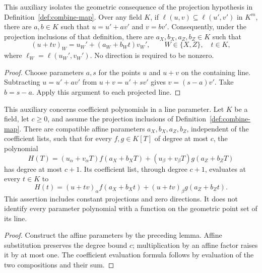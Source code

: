 \begin{lemma}
	\label{lem:combine-map-affine-parameters}
	\leanok
	This auxiliary isolates the geometric consequence of the projection
	hypothesis in Definition~\ref{def:combine-map}. Over any field $K$, if
	$\ell(u,v)\subseteq\ell(u',v')$ in $K^m$, there are $a,b\in K$ such that
	$u=u'+av'$ and $v=bv'$. Consequently, under the projection inclusions
	of that definition, there are $a_X,b_X,a_Z,b_Z\in K$ such that
	\[
		(u+tv)_W=u_W'+(a_W+b_Wt)v_W',
		\qquad W\in\{X,Z\},\quad t\in K,
	\]
	where $\ell_W=\ell(u_W',v_W')$. No direction is required to be nonzero.
\end{lemma}
\begin{proof}
	\leanok
	Choose parameters $a,s$ for the points $u$ and $u+v$ on the containing
	line. Subtracting $u=u'+av'$ from $u+v=u'+sv'$ gives
	$v=(s-a)v'$. Take $b=s-a$. Apply this argument to each projected line.
\end{proof}

\begin{lemma}
	\label{lem:combine-map-parameter-polynomial}
	\leanok
	This auxiliary concerns coefficient polynomials in a line parameter.
	Let $K$ be a field, let $c\geq0$, and assume the projection inclusions
	of Definition~\ref{def:combine-map}. There are compatible affine
	parameters $a_X,b_X,a_Z,b_Z$, independent of the coefficient lists,
	such that for every $f,g\in K[T]$ of degree at most $c$, the polynomial
	\[
		H(T)=(u_\alpha+v_\alpha T)f(a_X+b_XT)
		      +(u_\beta+v_\beta T)g(a_Z+b_ZT)
	\]
	has degree at most $c+1$. Its coefficient list, through degree $c+1$,
	evaluates at every $t\in K$ to
	\[
		H(t)=(u+tv)_\alpha f(a_X+b_Xt)
		     +(u+tv)_\beta g(a_Z+b_Zt).
	\]
	This assertion includes constant projections and zero directions. It
	does not identify every parameter polynomial with a function on the
	geometric point set of its line.
\end{lemma}
\begin{proof}
	\leanok
	Construct the affine parameters by the preceding lemma. Affine
	substitution preserves the degree bound $c$; multiplication by an affine
	factor raises it by at most one. The coefficient evaluation formula
	follows by evaluation of the two compositions and their sum.
\end{proof}

